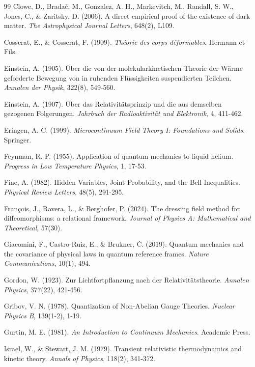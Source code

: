 \begin{thebibliography}{99}
Clowe, D., Brada\v{c}, M., Gonzalez, A. H., Markevitch, M., Randall, S. W., Jones, C., \& Zaritsky, D. (2006). A direct empirical proof of the existence of dark matter. \textit{The Astrophysical Journal Letters}, 648(2), L109.

Cosserat, E., \& Cosserat, F. (1909). \textit{Th\'{e}orie des corps d\'{e}formables}. Hermann et Fils.

Einstein, A. (1905). \"{U}ber die von der molekularkinetischen Theorie der W\"{a}rme geforderte Bewegung von in ruhenden Fl\"{u}ssigkeiten suspendierten Teilchen. \textit{Annalen der Physik}, 322(8), 549-560.

Einstein, A. (1907). \"{U}ber das Relativit\"{a}tsprinzip und die aus demselben gezogenen Folgerungen. \textit{Jahrbuch der Radioaktivit\"{a}t und Elektronik}, 4, 411-462.

Eringen, A. C. (1999). \textit{Microcontinuum Field Theory I: Foundations and Solids}. Springer.

Feynman, R. P. (1955). Application of quantum mechanics to liquid helium. \textit{Progress in Low Temperature Physics}, 1, 17-53.

Fine, A. (1982). Hidden Variables, Joint Probability, and the Bell Inequalities. \textit{Physical Review Letters}, 48(5), 291-295.

Fran\c{c}ois, J., Ravera, L., \& Berghofer, P. (2024). The dressing field method for diffeomorphisms: a relational framework. \textit{Journal of Physics A: Mathematical and Theoretical}, 57(30).

Giacomini, F., Castro-Ruiz, E., \& Brukner, \v{C}. (2019). Quantum mechanics and the covariance of physical laws in quantum reference frames. \textit{Nature Communications}, 10(1), 494.

Gordon, W. (1923). Zur Lichtfortpflanzung nach der Relativit\"{a}tstheorie. \textit{Annalen Physics}, 377(22), 421-456.

Gribov, V. N. (1978). Quantization of Non-Abelian Gauge Theories. \textit{Nuclear Physics B}, 139(1-2), 1-19.

Gurtin, M. E. (1981). \textit{An Introduction to Continuum Mechanics}. Academic Press.

Israel, W., \& Stewart, J. M. (1979). Transient relativistic thermodynamics and kinetic theory. \textit{Annals of Physics}, 118(2), 341-372.


\end{thebibliography}

